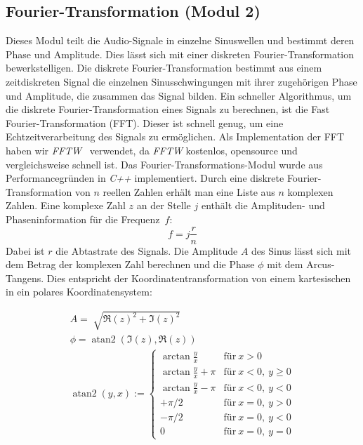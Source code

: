 \subsection{Fourier-Transformation (Modul 2)}
Dieses Modul teilt die Audio-Signale in einzelne Sinuswellen und bestimmt deren Phase und Amplitude. Dies lässt sich mit einer diskreten Fourier-Transformation bewerkstelligen. Die diskrete Fourier-Transformation bestimmt aus einem zeitdiskreten Signal die einzelnen Sinusschwingungen mit ihrer zugehörigen Phase und Amplitude, die zusammen das Signal bilden. Ein schneller Algorithmus, um die diskrete Fourier-Transformation eines Signals zu berechnen, ist die Fast Fourier-Transformation (FFT). Dieser ist schnell genug, um eine Echtzeitverarbeitung des Signals zu ermöglichen. Als Implementation der FFT haben wir \textit{FFTW}~\cite{FFTW} verwendet, da \textit{FFTW} kostenlos, opensource und vergleichsweise schnell ist.
Das Fourier-Transformations-Modul wurde aus Performancegründen in \textit{C++} implementiert.
Durch eine diskrete Fourier-Transformation von $n$ reellen Zahlen erhält man eine Liste aus $n$ komplexen Zahlen. Eine komplexe Zahl $z$ an der Stelle $j$ enthält die Amplituden- und Phaseninformation für die Frequenz~$f$:
\begin{equation}
f = j\frac{r}{n}
\end{equation}
Dabei ist $r$ die Abtastrate des Signals. Die Amplitude $A$ des Sinus lässt sich mit dem Betrag der komplexen Zahl berechnen und die Phase $\phi$ mit dem Arcus-Tangens. Dies entspricht der Koordinatentransformation von einem kartesischen in ein polares Koordinatensystem:\\
\begin{minipage}{0.59\textwidth}
   \begin{multline}
    A = \sqrt[]{{\Re(z)}^2 + {\Im(z)}^2}\\
    \phi = \operatorname{atan2}(\Im(z), \Re(z))\\
    \operatorname{atan2}(y,x) := \begin{cases} \arctan\frac{y}{x} & \mathrm{für}\ x > 0\\ \arctan\frac{y}{x} + \pi & \mathrm{für}\ x < 0,\ y \geq 0\\ \arctan\frac{y}{x} - \pi & \mathrm{für}\ x < 0,\ y < 0\\ +\pi/2 & \mathrm{für}\ x = 0,\ y > 0\\ -\pi/2 & \mathrm{für}\ x = 0,\ y < 0\\ 0 & \mathrm{für}\ x = 0,\ y = 0 \end{cases}
    \end{multline}
\end{minipage}
